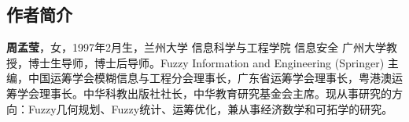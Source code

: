 \begin{center}
\section*{作者简介}
\end{center}
\textbf{周孟莹}，女，1997年2月生，兰州大学 信息科学与工程学院 信息安全 广州大学教授，博士生导师，博士后导师。Fuzzy Information and Engineering (Springer) 主编，中国运筹学会模糊信息与工程分会理事长，广东省运筹学会理事长，粤港澳运筹学会理事长。中华科教出版社社长，中华教育研究基金会主席。现从事研究的方向：Fuzzy几何规划、Fuzzy统计、运筹优化，兼从事经济数学和可拓学的研究。
